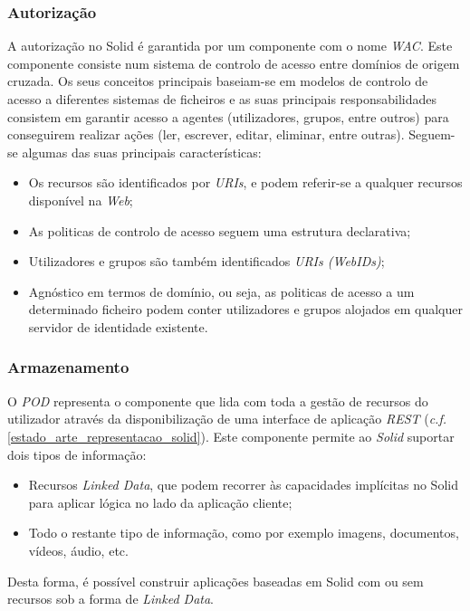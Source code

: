 \subsubsection{Autorização}
A autorização no Solid é garantida por um componente com o nome \emph{\acrfull{WAC}}. Este componente consiste num sistema de controlo de acesso entre domínios de origem cruzada. Os seus conceitos principais baseiam-se em modelos de controlo de acesso a diferentes sistemas de ficheiros e as suas principais responsabilidades consistem em garantir acesso a agentes (utilizadores, grupos, entre outros) para conseguirem realizar ações (ler, escrever, editar, eliminar, entre outras)\cite{solid_web_access_control}.
Seguem-se algumas das suas principais características:
\begin{itemize}
    \item Os recursos são identificados por \emph{URIs}, e podem referir-se a qualquer recursos disponível na \emph{Web};
    \item As politicas de controlo de acesso seguem uma estrutura declarativa;
    \item Utilizadores e grupos são também identificados \emph{URIs (WebIDs)};
    \item Agnóstico em termos de domínio, ou seja, as politicas de acesso a um determinado ficheiro podem conter utilizadores e grupos alojados em qualquer servidor de identidade existente.
\end{itemize}

\subsubsection{Armazenamento \label{subsection_solid_armazenamento}}
O \emph{\acrshort{POD}} representa o componente que lida com toda a gestão de recursos do utilizador através da disponibilização de uma interface de aplicação \emph{\acrshort{REST}} (\emph{c.f.} \ref{estado_arte_representacao_solid}). Este componente permite ao \emph{Solid} suportar dois tipos de informação:
\begin{itemize}
    \item Recursos \emph{Linked Data}, que podem recorrer às capacidades implícitas no Solid para aplicar lógica no lado da aplicação cliente;
    \item Todo o restante tipo de informação, como por exemplo imagens, documentos, vídeos, áudio, etc.
\end{itemize}

Desta forma, é possível construir aplicações baseadas em Solid com ou sem recursos sob a forma de \emph{Linked Data}\cite{solid_spec}.

